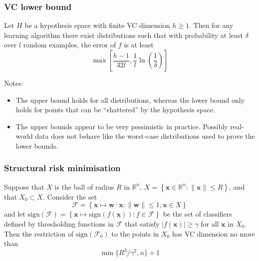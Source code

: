 \subsubsection{VC lower bound}

Let $H$ be a hypothesis space with finite VC dimension $h \geq 1$.
Then for any learning algorithm there exist distributions such that
with probability at least $\delta$ over $l$ random examples, the error
of $f$ is at least
\begin{equation}
\max \left[ \frac{h-1}{32l}, \frac{1}{l} \ln \left( \frac{1}{\delta}
\right) \right]
\end{equation}

\noindent Notes:

\begin{itemize}

\item	The upper bound holds for all distributions, whereas the lower
	bound only holds for points that can be ``shattered'' by the
	hypothesis space.

\item	The upper bounds appear to be very pessimistic in practice.
	Possibly real-world data does not behave like the worst-case
	distributions used to prove the lower bounds.

\end{itemize}

\subsubsection{Structural risk minimisation}

Suppose that $X$ is the ball of radius $R$ in $\mathbb{R}^n$,
$X = \left\{ \mathbf{x} \in \mathbb{R}^n : \| \mathbf{x} \| \leq R
\right\} $, and that $X_0 \subset X$.  Consider the set
\begin{equation}
\mathcal{F} = \left\{ \mathbf{x} \mapsto \mathbf{w} \cdot \mathbf{x} :
\|\mathbf{w}\| \leq 1, \mathbf{x} \in X \right\}
\end{equation}
and let $\mathrm{sign}(\mathcal{F}) = \left\{ \mathbf{x} \mapsto
\mathrm{sign}(f(\mathbf{x})) : f \in \mathcal{F} \right\}$ be the set of
classifiers defined by thresholding functions in $\mathcal{F}$ that
satisfy $|f(\mathbf{x})| \geq \gamma$ for all $\mathbf{x}$ in $X_0$.
Then the restriction of $\mathrm{sign}(\mathcal{F}_0)$ to the points
in $X_0$ has VC dimension no more than
\begin{equation}
\min \{R^2/\gamma^2, n\} + 1
\end{equation}


